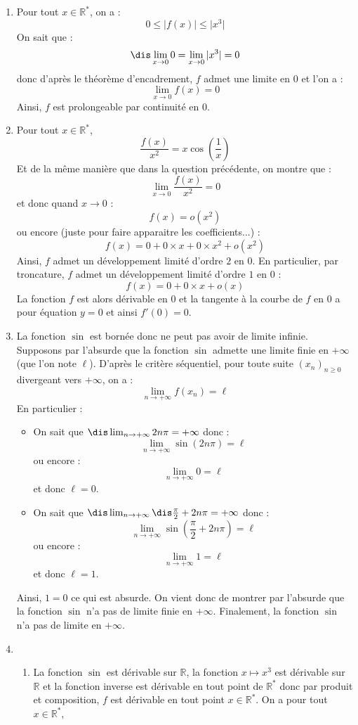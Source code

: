 \documentclass[a4paper,10pt]{report}
\begin{document}
\corr \begin{enumerate}
\item Pour tout $x \in \mathbb{R}^*$, on a :
$$ 0 \leq \vert f(x) \vert \leq \vert x^3 \vert$$
On sait que :
$$\dis \lim_{x \rightarrow 0} 0 = \lim_{x \rightarrow 0} \vert x^3 \vert = 0$$
donc d'après le théorème d'encadrement, $f$ admet une limite en $0$ et l'on a :
$$ \lim_{x \rightarrow 0} f(x) = 0$$
Ainsi, $f$ est prolongeable par continuité en $0$.
\item Pour tout $x \in \mathbb{R}^*$, 
$$ \dfrac{f(x)}{x^2} = x \cos \left( \frac{1}{x} \right) $$
Et de la même manière que dans la question précédente, on montre que :
$$ \lim_{x \rightarrow 0} \dfrac{f(x)}{x^2} = 0$$
et donc quand $x \rightarrow 0$ :
$$ f(x) = o(x^2)$$
ou encore (juste pour faire apparaitre les coefficients...) :
$$ f(x) = 0 + 0 \times x + 0 \times x^2+ o(x^2)$$
Ainsi, $f$ admet un développement limité d'ordre $2$ en $0$. En particulier, par troncature, $f$ admet un développement limité d'ordre $1$ en $0$ :
$$ f(x) = 0 + 0 \times x + o(x)$$
La fonction $f$ est alors dérivable en $0$ et la tangente à la courbe de $f$ en $0$ a pour équation $y=0$ et ainsi $f'(0)=0$. 
\item La fonction $\sin$ est bornée donc ne peut pas avoir de limite infinie. Supposons par l'absurde que la fonction $\sin$ admette une limite finie en $+ \infty$ (que l'on note $\ell$). D'après le critère séquentiel, pour toute suite $(x_n)_{n \geq 0}$ divergeant vers $+ \infty$, on a :
$$ \lim_{n \rightarrow + \infty} f(x_n) = \ell$$
En particulier :
\begin{itemize}
\item On sait que $\dis \lim_{n \rightarrow + \infty} 2n \pi = + \infty$ donc :
$$ \lim_{n \rightarrow + \infty} \sin(2n \pi) = \ell$$
ou encore :
$$ \lim_{n \rightarrow + \infty} 0 = \ell$$
et donc $\ell =0$.
\item On sait que $\dis \lim_{n \rightarrow + \infty} \dis \frac{\pi}{2} + 2n \pi = + \infty$ donc :
$$ \lim_{n \rightarrow + \infty} \sin \left( \frac{\pi}{2} + 2n \pi \right) = \ell$$
ou encore :
$$ \lim_{n \rightarrow + \infty} 1 = \ell$$
et donc $\ell =1$.
\end{itemize}
Ainsi, $1=0$ ce qui est absurde. On vient donc de montrer par l'absurde que la fonction $\sin$ n'a pas de limite finie en $+ \infty$. Finalement, la fonction $\sin$ n'a pas de limite en $+ \infty$.
\item 
\begin{enumerate}
\item La fonction $\sin$ est dérivable sur $\mathbb{R}$, la fonction $x \mapsto x^3$ est dérivable sur $\mathbb{R}$ et la fonction inverse est dérivable en tout point de $\mathbb{R}^*$ donc par produit et composition, $f$ est dérivable en tout point $x \in \mathbb{R}^*$. On a pour tout $x \in  \mathbb{R}^*$,

\end{enumerate}
\end{enumerate}
\end{document}
